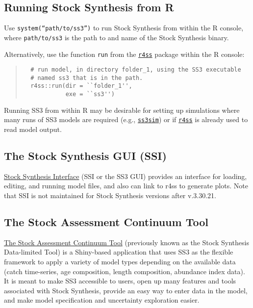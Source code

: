 \subsection{Running Stock Synthesis from R}

Use \texttt{system(``path/to/ss3'')} to run Stock Synthesis from within the R console, where \texttt{path/to/ss3} is the path to and name of the Stock Synthesis binary.

Alternatively, use the function \texttt{run} from the \href{https://r4ss.github.io/r4ss/index.html}{\texttt{r4ss}} package within the R console:

\begin{quote}
  \begin{verbatim}
  # run model, in directory folder_1, using the SS3 executable
  # named ss3 that is in the path.
  r4ss::run(dir = ``folder_1'',
            exe = ``ss3'')
  \end{verbatim}
\end{quote}



Running SS3 from within R may be desirable for setting up simulations where many runs of SS3 models are required (e.g., \href{https://github.com/ss3sim/ss3sim}{\texttt{ss3sim}}) or if \href{https://r4ss.github.io/r4ss/index.html}{\texttt{r4ss}} is already used to read model output.

\subsection{The Stock Synthesis GUI (SSI)}
\href{https://vlab.noaa.gov/web/stock-synthesis/document-library/-/document_library/0LmuycloZeIt/view/5042951}{Stock Synthesis Interface} (SSI or the SS3 GUI) provides an interface for loading, editing, and running model files, and also can link to r4ss to generate plots. Note that SSI is not maintained for Stock Synthesis versions after v.3.30.21.

\subsection{The Stock Assessment Continuum Tool}
\href{https://github.com/shcaba/SS-DL-tool}{The Stock Assessment Continuum Tool} (previously known as the Stock Synthesis Data-limited Tool) is a Shiny-based application that uses SS3 as the flexible framework to apply a variety of model types depending on the available data (catch time-series, age composition, length composition, abundance index data). It is meant to make SS3 accessible to users, open up many features and tools associated with Stock Synthesis, provide an easy way to enter data in the model, and make model specification and uncertainty exploration easier.

